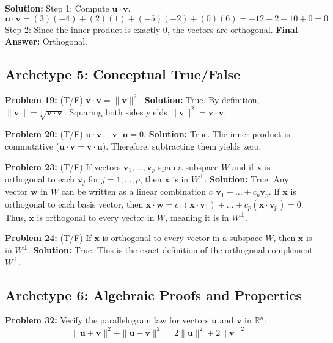 \documentclass[11pt, letterpaper]{article}
\theoremstyle{definition}
\theoremstyle{remark}
\newcommand{\R}{\mathbb{R}}
\begin{document}
\textbf{Solution:}
Step 1: Compute $\mathbf{u} \cdot \mathbf{v}$.
\[ \mathbf{u} \cdot \mathbf{v} = (3)(-4) + (2)(1) + (-5)(-2) + (0)(6) = -12 + 2 + 10 + 0 = 0 \]
Step 2: Since the inner product is exactly $0$, the vectors are orthogonal.
\textbf{Final Answer:} Orthogonal.

\subsection{Archetype 5: Conceptual True/False}

\textbf{Problem 19:} (T/F) $\mathbf{v} \cdot \mathbf{v} = \|\mathbf{v}\|^2$.
\textbf{Solution:} True. By definition, $\|\mathbf{v}\| = \sqrt{\mathbf{v} \cdot \mathbf{v}}$. Squaring both sides yields $\|\mathbf{v}\|^2 = \mathbf{v} \cdot \mathbf{v}$.

\textbf{Problem 20:} (T/F) $\mathbf{u} \cdot \mathbf{v} - \mathbf{v} \cdot \mathbf{u} = 0$.
\textbf{Solution:} True. The inner product is commutative ($\mathbf{u} \cdot \mathbf{v} = \mathbf{v} \cdot \mathbf{u}$). Therefore, subtracting them yields zero.

\textbf{Problem 23:} (T/F) If vectors $\mathbf{v}_1, \dots, \mathbf{v}_p$ span a subspace $W$ and if $\mathbf{x}$ is orthogonal to each $\mathbf{v}_j$ for $j = 1, \dots, p$, then $\mathbf{x}$ is in $W^\perp$.
\textbf{Solution:} True. Any vector $\mathbf{w}$ in $W$ can be written as a linear combination $c_1\mathbf{v}_1 + \dots + c_p\mathbf{v}_p$. If $\mathbf{x}$ is orthogonal to each basis vector, then $\mathbf{x} \cdot \mathbf{w} = c_1(\mathbf{x} \cdot \mathbf{v}_1) + \dots + c_p(\mathbf{x} \cdot \mathbf{v}_p) = 0$. Thus, $\mathbf{x}$ is orthogonal to every vector in $W$, meaning it is in $W^\perp$.

\textbf{Problem 24:} (T/F) If $\mathbf{x}$ is orthogonal to every vector in a subspace $W$, then $\mathbf{x}$ is in $W^\perp$.
\textbf{Solution:} True. This is the exact definition of the orthogonal complement $W^\perp$.

\subsection{Archetype 6: Algebraic Proofs and Properties}

\textbf{Problem 32:} Verify the parallelogram law for vectors $\mathbf{u}$ and $\mathbf{v}$ in $\R^n$:
\[ \|\mathbf{u} + \mathbf{v}\|^2 + \|\mathbf{u} - \mathbf{v}\|^2 = 2\|\mathbf{u}\|^2 + 2\|\mathbf{v}\|^2 \]
\end{document}
